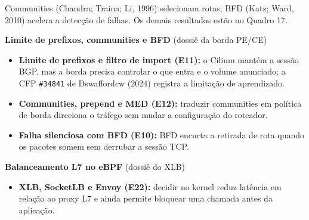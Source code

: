 \documentclass[12pt,openany,oneside,a4paper,chapter=TITLE,english,brazil]{abntex2}
\providecommand{\tightlist}{\setlength{\itemsep}{0pt}\setlength{\parskip}{0pt}}
\begin{document}
Communities (Chandra; Traina; Li, 1996) selecionam rotas; BFD (Katz; Ward, 2010) acelera a detecção de falhas. Os demais resultados estão no Quadro 17.

\textbf{Limite de prefixos, communities e BFD} (dossiê da borda PE/CE)

\begin{itemize}
\tightlist
\item
  \textbf{Limite de prefixos e filtro de import (E11):} o Cilium mantém a sessão BGP, mas a borda precisa controlar o que entra e o volume anunciado; a CFP \texttt{\#34841} de Dswaffordcw (2024) registra a limitação de aprendizado.
\item
  \textbf{Communities, prepend e MED (E12):} traduzir communities em política de borda direciona o tráfego sem mudar a configuração do roteador.
\item
  \textbf{Falha silenciosa com BFD (E10):} BFD encurta a retirada de rota quando os pacotes somem sem derrubar a sessão TCP.
\end{itemize}

\textbf{Balanceamento L7 no eBPF} (dossiê do XLB)

\begin{itemize}
\tightlist
\item
  \textbf{XLB, SocketLB e Envoy (E22):} decidir no kernel reduz latência em relação ao proxy L7 e ainda permite bloquear uma chamada antes da aplicação.
\end{itemize}
\end{document}

